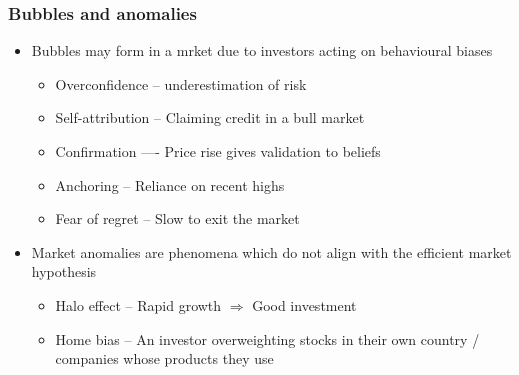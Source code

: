 \documentclass[../notes_compiled.tex]{subfiles}
\begin{document}
\subsubsection{Bubbles and anomalies}
\begin{itemize}
\item Bubbles may form in a mrket due to investors acting on behavioural biases
\begin{itemize}
\item Overconfidence -- underestimation of risk
\item Self-attribution -- Claiming credit in a bull market
\item Confirmation ---- Price rise gives validation to beliefs
\item Anchoring -- Reliance on recent highs
\item Fear of regret -- Slow to exit the market
\end{itemize}
\item Market anomalies are phenomena which do not align with the efficient market hypothesis
\begin{itemize}
\item Halo effect -- Rapid growth $\Rightarrow$ Good investment
\item Home bias -- An investor overweighting stocks in their own country / companies whose products they use
\end{itemize}
\end{itemize}
\end{document}
